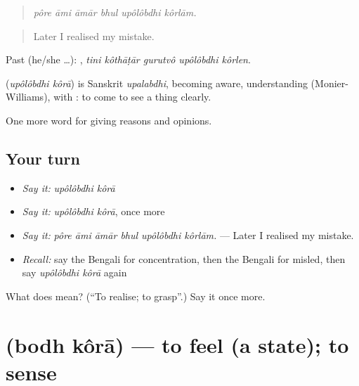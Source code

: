 \begin{quote}
     
\end{quote}

\begin{quote}
\emph{pôre āmi āmār bhul upôlôbdhi kôrlām.}
\end{quote}

\begin{quote}
Later I realised my mistake.
\end{quote}

Past (he/she …):     , \emph{tini kôthāṭār gurutvô upôlôbdhi kôrlen}.

\begin{cousinweb}
\textbf{ } (\emph{upôlôbdhi kôrā}) is Sanskrit \emph{upalabdhi}, becoming aware, understanding (Monier-Williams), with : to come to see a thing clearly.
\end{cousinweb}

\begin{grammarlens}[title={What you've built}]
One more word for giving reasons and opinions.
\end{grammarlens}

\subsection*{Your turn}
\begin{itemize}
\raggedright
  \item \emph{Say it:} \emph{upôlôbdhi kôrā}
  \item \emph{Say it:} \emph{upôlôbdhi kôrā}, once more
  \item \emph{Say it:} \emph{pôre āmi āmār bhul upôlôbdhi kôrlām.} — Later I realised my mistake.
  \item \emph{Recall:} say the Bengali for concentration, then the Bengali for misled, then say \emph{upôlôbdhi kôrā} again
\end{itemize}

\begin{tcolorbox}[breakable,colback=teal!4,colframe=teal!35!black,title={Before you move on}]
What does   mean? (\textquotedblleft{}To realise; to grasp\textquotedblright{}.) Say it once more.
\end{tcolorbox}
\section[\texorpdfstring{\bn{বোধ} \bn{করা} (bodh kôrā)}{বোধ করা (bodh kôrā)}]{  (bodh kôrā) — to feel (a state); to sense}

